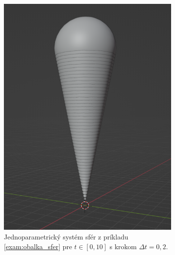 \begin{example}
\begin{figure}[h]
    \centering
    \begin{subfigure}[t]{0.45\textwidth}
        \centering
        \includegraphics[width=\textwidth]{images/cornetto.png}
	\caption[Jednoparametrický systém sfér.]{Jednoparametrický systém sfér z príkladu \ref{exam:obalka_sfer} pre $t \in [0,10]$ s krokom $\Delta t = 0,2.$ }
	\label{fig:cornetto}
    \end{subfigure}
    ~
    \begin{subfigure}[t]{0.45\textwidth}
        \centering

\end{subfigure}
\end{figure}
\end{example}
